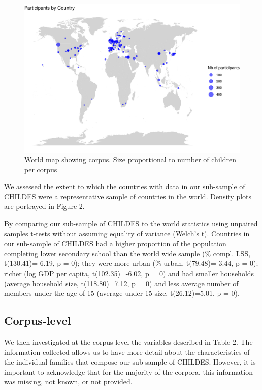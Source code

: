 \documentclass[
  man,floatsintext]{apa6}
\begin{document}
\begin{figure}
\centering
\includegraphics{CHILDES_short_files/figure-latex/unnamed-chunk-1-1.pdf}
\caption{\label{fig:unnamed-chunk-1}World map showing corpus. Size proportional to number of children per corpus}
\end{figure}

We assessed the extent to which the countries with data in our sub-sample of CHILDES were a representative sample of countries in the world. Density plots are portrayed in Figure 2.

By comparing our sub-sample of CHILDES to the world statistics using unpaired samples t-tests without assuming equality of variance (Welch's t). Countries in our sub-sample of CHILDES had a higher proportion of the population completing lower secondary school than the world wide sample (\% compl. LSS, t(130.41)=-6.19, p = 0); they were more urban (\% urban, t(79.48)=-3.44, p = 0); richer (log GDP per capita, t(102.35)=-6.02, p = 0) and had smaller households (average household size, t(118.80)=7.12, p = 0) and less average number of members under the age of 15 (average under 15 size, t(26.12)=5.01, p = 0).

\hypertarget{corpus-level}{%
\subsection{Corpus-level}\label{corpus-level}}

We then investigated at the corpus level the variables described in Table 2. The information collected allows us to have more detail about the characteristics of the individual families that compose our sub-sample of CHILDES. However, it is important to acknowledge that for the majority of the corpora, this information was missing, not known, or not provided.
\end{document}
